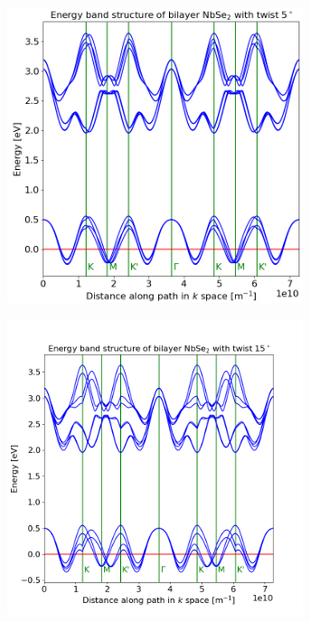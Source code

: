 \documentclass[12pt]{report} %
\begin{document}
\begin{figure}[t!]
\centering
  \begin{subfigure}[t]{0.45\textwidth}
    \centering
    \includegraphics[width=0.95\textwidth]{bilayer_bands_5.png}
    \caption{
    }
    \label{bilayer_bands_5}
  \end{subfigure}
  \hfill
  \begin{subfigure}[t]{0.45\textwidth}
    \centering
    \includegraphics[width=0.95\textwidth]{bilayer_bands_15.png}
    \caption{
    }
    \label{bilayer_bands_15}
  \end{subfigure}
  \caption{}
  \label{bilayer_bands}
\end{figure}
\end{document}

